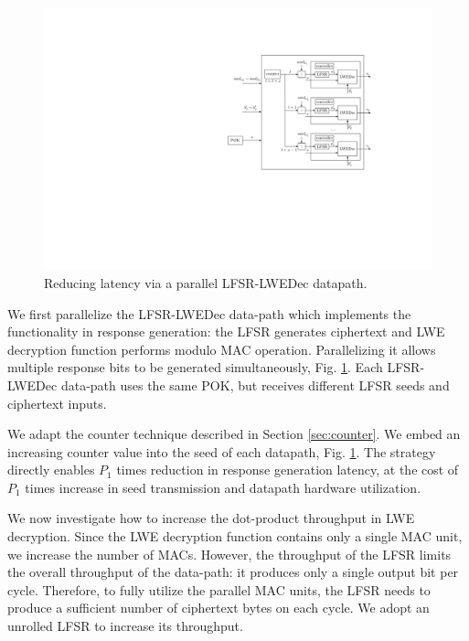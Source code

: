 \begin{figure}[t!]
\centering
\includegraphics[width = 0.8\linewidth]{./figs/lpuf_p1}
\caption{Reducing latency via a parallel LFSR-LWEDec datapath.}
\label{fig:lpuf_p1}
\end{figure}

We first parallelize the LFSR-LWEDec data-path which implements the functionality in response generation: the LFSR generates ciphertext and LWE decryption function performs modulo MAC operation. Parallelizing it allows multiple response bits to be generated simultaneously, Fig. \ref{fig:lpuf_p1}. Each LFSR-LWEDec data-path uses the same POK, but receives different LFSR seeds and ciphertext inputs. 

We adapt the counter technique described in Section \ref{sec:counter}. %
We embed an increasing counter value into the seed of each datapath, Fig. \ref{fig:lpuf_p1}. %
The strategy directly enables $P_1$ times reduction in response generation latency, at the cost of $P_1$ times increase in seed transmission and datapath hardware utilization.

We now investigate how to increase the dot-product throughput in LWE decryption. Since the LWE decryption function contains only a single MAC unit, we increase the number of MACs. However, the throughput of the LFSR limits the overall throughput of the data-path: it produces only a single output bit per cycle. %
Therefore, to fully utilize the parallel MAC units, the LFSR needs to produce a sufficient number of ciphertext bytes on each cycle. We adopt an unrolled LFSR to increase its throughput.


